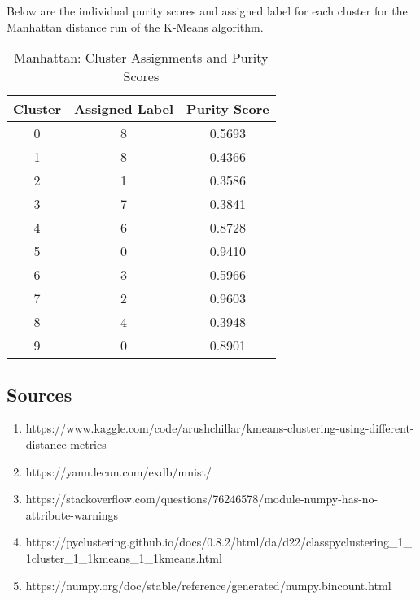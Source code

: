 \documentclass{article}
\begin{document}
Below are the individual purity scores and assigned label for each cluster for the Manhattan distance
run of the K-Means algorithm.


\begin{table}[h!]
\centering
\begin{tabular}{|c|c|c|}
\hline
\textbf{Cluster} & \textbf{Assigned Label} & \textbf{Purity Score} \\
\hline
0 & 8 & 0.5693 \\
1 & 8 & 0.4366 \\
2 & 1 & 0.3586 \\
3 & 7 & 0.3841 \\
4 & 6 & 0.8728 \\
5 & 0 & 0.9410 \\
6 & 3 & 0.5966 \\
7 & 2 & 0.9603 \\
8 & 4 & 0.3948 \\
9 & 0 & 0.8901 \\
\hline
\end{tabular}
\caption{Manhattan: Cluster Assignments and Purity Scores}
\end{table}

\subsection*{Sources}
\begin{enumerate}
\item https://www.kaggle.com/code/arushchillar/kmeans-clustering-using-different-distance-metrics
\item https://yann.lecun.com/exdb/mnist/
\item https://stackoverflow.com/questions/76246578/module-numpy-has-no-attribute-warnings
\item https://pyclustering.github.io/docs/0.8.2/html/da/d22/classpyclustering\_1\_1cluster\_1\_1kmeans\_1\_1kmeans.html
\item https://numpy.org/doc/stable/reference/generated/numpy.bincount.html
\end{enumerate}
\end{document}
